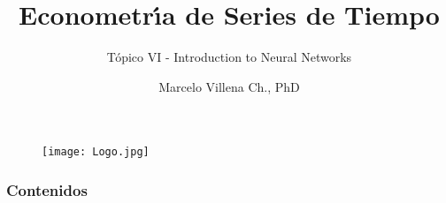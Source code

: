 \documentclass[spanish,xcolor=table]{beamer}
\title[ECO -TS101]{Econometr\'\i{}a de Series de Tiempo}
\subtitle{T\'opico VI - Introduction to Neural Networks}
\author{Marcelo Villena Ch., PhD}
\institute[UAI] %
{
Universidad Adolfo Ib\'a\~nez 
 \\ %
\medskip
}
\date{} %
\begin{document}
\begin{frame}

\begin{figure}[t!]
\texttt{[image: Logo.jpg]}
\end{figure}
\titlepage %
\end{frame}

\begin{frame}
\frametitle{Contenidos} 
\tableofcontents %
\end{frame}


\end{document}

